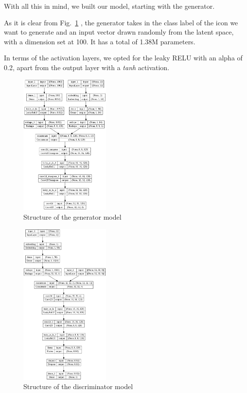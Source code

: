With all this in mind, we built our model, starting with the generator.

As it is clear from Fig.~\ref{fig:GenStruct} , the generator takes in the class label of the icon we want to generate and an input vector drawn randomly from the latent space, with a dimension set at 100.
It has a total of 1.38M parameters.

In terms of the activation layers, we opted for the leaky RELU with an alpha of 0.2, apart from the output layer with a \textit{tanh} activation.

\begin{figure}[htbp]
    \centering
    \includegraphics[width=0.4\textwidth]{images/summary/generator}
    \caption{Structure of the generator model}
    \label{fig:GenStruct}
\end{figure}

\begin{figure}[htbp]
    \centering
    \includegraphics[width=0.4\textwidth]{images/summary/discriminator}
    \caption{Structure of the discriminator model}
    \label{fig:DiscStruct}
\end{figure}


